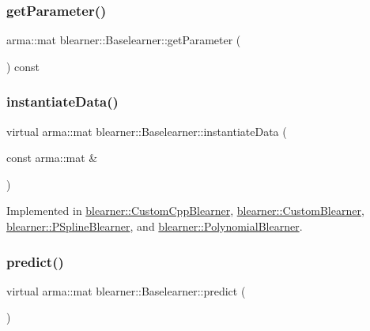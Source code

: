 \subsubsection{\texorpdfstring{get\+Parameter()}{getParameter()}}
{\footnotesize\ttfamily arma\+::mat blearner\+::\+Baselearner\+::get\+Parameter (\begin{DoxyParamCaption}{ }\end{DoxyParamCaption}) const}

\mbox{\label{classblearner_1_1_baselearner_af01f1b8c4540927705ff79c3649489f7}} 
\subsubsection{\texorpdfstring{instantiate\+Data()}{instantiateData()}}
{\footnotesize\ttfamily virtual arma\+::mat blearner\+::\+Baselearner\+::instantiate\+Data (\begin{DoxyParamCaption}\item[{const arma\+::mat \&}]{ }\end{DoxyParamCaption})\hspace{0.3cm}{\ttfamily [pure virtual]}}



Implemented in \mbox{\hyperlink{classblearner_1_1_custom_cpp_blearner_a14607a1d1f312d46a3024b37085c146d}{blearner\+::\+Custom\+Cpp\+Blearner}}, \mbox{\hyperlink{classblearner_1_1_custom_blearner_a18971368219f6948456b8e60c20b6968}{blearner\+::\+Custom\+Blearner}}, \mbox{\hyperlink{classblearner_1_1_p_spline_blearner_ac0604daac451678e67a6a2ac60dd1b01}{blearner\+::\+P\+Spline\+Blearner}}, and \mbox{\hyperlink{classblearner_1_1_polynomial_blearner_a5d3a44e8a4a8155ac24ee05e2c68af75}{blearner\+::\+Polynomial\+Blearner}}.

\mbox{\label{classblearner_1_1_baselearner_ab37986047db43c84420fef2cef7fc20d}} 
\subsubsection{\texorpdfstring{predict()}{predict()}\hspace{0.1cm}{\footnotesize\ttfamily [1/2]}}
{\footnotesize\ttfamily virtual arma\+::mat blearner\+::\+Baselearner\+::predict (\begin{DoxyParamCaption}{ }\end{DoxyParamCaption})\hspace{0.3cm}{\ttfamily [pure virtual]}}



